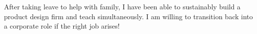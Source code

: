 \vspace{1ex}
\hfill\begin{minipage}{\dimexpr\textwidth-2ex}
After taking leave to help with family, I have been able to sustainably build a product design firm and teach simultaneously. I am willing to transition back into a corporate role if the right job arises!

\end{minipage}